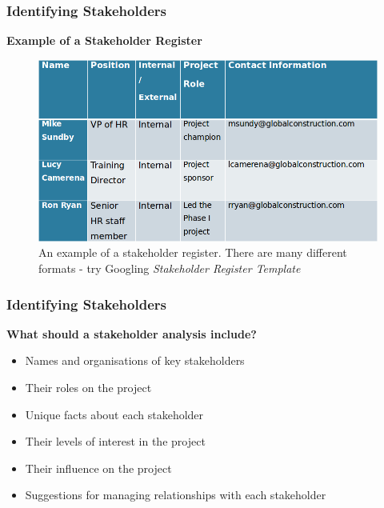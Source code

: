 \documentclass{beamer}
\begin{document}
\begin{frame}
\frametitle{Identifying Stakeholders}
\textbf{Example of a Stakeholder Register}\\
\begin{figure}
\includegraphics[scale=0.5]{stakeholder_reg}
\caption{An example of a stakeholder register. There are many different formats - try Googling \textit{Stakeholder Register Template}}
\end{figure}
\end{frame}

\begin{frame}
\frametitle{Identifying Stakeholders}
\textbf{What should a stakeholder analysis include?}
\vspace{0.5cm}
\begin{itemize}
\item Names and organisations of key stakeholders
\item Their roles on the project
\item Unique facts about each stakeholder
\item Their levels of interest in the project
\item Their influence on the project
\item Suggestions for managing relationships with each stakeholder
\end{itemize}
\end{frame}
\end{document}
